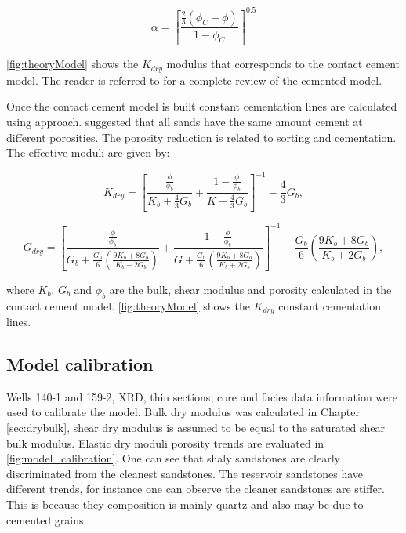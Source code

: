 \begin{equation}
\alpha=\left[\frac{\frac{2}{3}(\phi_{C}-\phi)}{1-\phi_{C}}\right]^{0.5}
\end{equation}

\ref{fig:theoryModel} shows the $K_{dry}$ modulus that corresponds to the contact cement model.
The reader is referred to \cite{ref:dvorkin2} for a complete review of the cemented model.

Once the contact cement model is built constant cementation lines are calculated using \cite{ref:avseth2} approach.
\cite{ref:avseth2} suggested that all sands have the same amount cement at different porosities. The porosity reduction
 is related to sorting and cementation. The effective moduli are given by: 

\begin{equation}
K_{dry}=\left[\frac{\frac{\phi}{\phi_{b}}}{K_{b}+\frac{4}{3}G_{b}}+\frac{1-\frac{\phi}{\phi_{b}}}{K+\frac{4}{3}G_{b}}\right]^{-1}-\frac{4}{3}G_{b},
  \label{eq:kdry}
\end{equation}

\begin{equation}
G_{dry}=\left[\frac{\frac{\phi}{\phi_{b}}}{G_{b}+\frac{G_{b}}{6}\left(\frac{9K_{b}+8G_{b}}{K_{b}+2G_{b}}\right)}+\frac{1-\frac{\phi}{\phi_{b}}}{G+\frac{G_{b}}{6}\left(\frac{9K_{b}+8G_{b}}{K_{b}+2G_{b}}\right)}\right]^{-1}-\frac{G_{b}}{6}\left(\frac{9K_{b}+8G_{b}}{K_{b}+2G_{b}}\right),
  \label{eq:kdry}
\end{equation}


where $K_{b}$, $G_{b}$ and $\phi_{b}$ are the bulk, shear modulus and porosity calculated in the contact cement model.
\ref{fig:theoryModel} shows the $K_{dry}$ constant cementation lines.
 


\subsection{Model calibration}

Wells 140-1 and 159-2, XRD, thin sections, core and facies data information were used to calibrate the model.
Bulk dry modulus was calculated in Chapter \ref{sec:drybulk}, shear dry modulus is assumed  to be
equal to the saturated shear bulk modulus. Elastic dry moduli porosity trends are evaluated
in \ref{fig:model_calibration}. One can see that shaly sandstones are clearly discriminated from
the cleanest sandstones. The reservoir sandstones have different trends, for instance one can 
observe the cleaner sandstones are stiffer. This is because they composition is mainly quartz 
and also may be due to cemented grains. 


